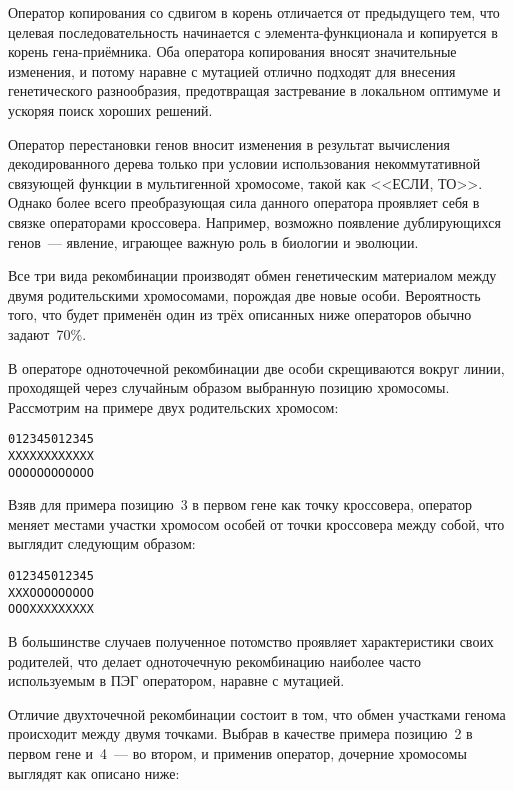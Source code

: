 Оператор копирования со сдвигом в корень отличается от предыдущего тем, что целевая последовательность начинается с элемента-функционала и копируется в корень гена-приёмника. Оба оператора копирования вносят значительные изменения, и потому наравне с мутацией отлично подходят для внесения генетического разнообразия, предотвращая застревание в локальном оптимуме и ускоряя поиск хороших решений.

Оператор перестановки генов вносит изменения в результат вычисления декодированного дерева только при условии использования некоммутативной связующей функции в мультигенной хромосоме, такой как <<ЕСЛИ, ТО>>. Однако более всего преобразующая сила данного оператора проявляет себя в связке операторами кроссовера. Например, возможно появление дублирующихся генов~--- явление, играющее важную роль в биологии и эволюции.

Все три вида рекомбинации производят обмен генетическим материалом между двумя родительскими хромосомами, порождая две новые особи. Вероятность того, что будет применён один из трёх описанных ниже операторов обычно задают~70\%.

В операторе одноточечной рекомбинации две особи скрещиваются вокруг линии, проходящей через случайным образом выбранную позицию хромосомы. Рассмотрим на примере двух родительских хромосом:

\begin{samepage}
\begin{alltt}
012345012345
XXXXXXXXXXXX
OOOOOOOOOOOO
\end{alltt}
\end{samepage}

Взяв для примера позицию~3 в первом гене как точку кроссовера, оператор меняет местами участки хромосом особей от точки кроссовера между собой, что выглядит следующим образом:

\begin{samepage}
\begin{alltt}
012345012345
XXXOOOOOOOOO
OOOXXXXXXXXX
\end{alltt}
\end{samepage}

В большинстве случаев полученное потомство проявляет характеристики своих родителей, что делает одноточечную рекомбинацию наиболее часто используемым в ПЭГ оператором, наравне с мутацией.

Отличие двухточечной рекомбинации состоит в том, что обмен участками генома происходит между двумя точками. Выбрав в качестве примера позицию~2 в первом гене и~4~--- во втором, и применив оператор, дочерние хромосомы выглядят как описано ниже:

